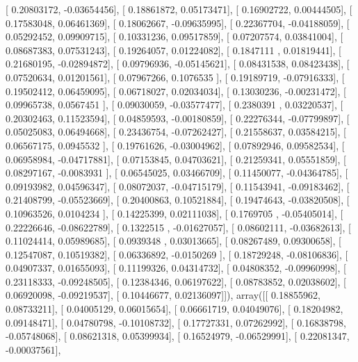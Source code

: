 \documentclass{article}
\begin{document}
       [ 0.20803172, -0.03654456],
       [ 0.18861872,  0.05173471],
       [ 0.16902722,  0.00444505],
       [ 0.17583048,  0.06461369],
       [ 0.18062667, -0.09635995],
       [ 0.22367704, -0.04188059],
       [ 0.05292452,  0.09909715],
       [ 0.10331236,  0.09517859],
       [ 0.07207574,  0.03841004],
       [ 0.08687383,  0.07531243],
       [ 0.19264057,  0.01224082],
       [ 0.1847111 ,  0.01819441],
       [ 0.21680195, -0.02894872],
       [ 0.09796936, -0.05145621],
       [ 0.08431538,  0.08423438],
       [ 0.07520634,  0.01201561],
       [ 0.07967266,  0.1076535 ],
       [ 0.19189719, -0.07916333],
       [ 0.19502412,  0.06459095],
       [ 0.06718027,  0.02034034],
       [ 0.13030236, -0.00231472],
       [ 0.09965738,  0.0567451 ],
       [ 0.09030059, -0.03577477],
       [ 0.2380391 ,  0.03220537],
       [ 0.20302463,  0.11523594],
       [ 0.04859593, -0.00180859],
       [ 0.22276344, -0.07799897],
       [ 0.05025083,  0.06494668],
       [ 0.23436754, -0.07262427],
       [ 0.21558637,  0.03584215],
       [ 0.06567175,  0.0945532 ],
       [ 0.19761626, -0.03004962],
       [ 0.07892946,  0.09582534],
       [ 0.06958984, -0.04717881],
       [ 0.07153845,  0.04703621],
       [ 0.21259341,  0.05551859],
       [ 0.08297167, -0.0083931 ],
       [ 0.06545025,  0.03466709],
       [ 0.11450077, -0.04364785],
       [ 0.09193982,  0.04596347],
       [ 0.08072037, -0.04715179],
       [ 0.11543941, -0.09183462],
       [ 0.21408799, -0.05523669],
       [ 0.20400863,  0.10521884],
       [ 0.19474643, -0.03820508],
       [ 0.10963526,  0.0104234 ],
       [ 0.14225399,  0.02111038],
       [ 0.1769705 , -0.05405014],
       [ 0.22226646, -0.08622789],
       [ 0.1322515 , -0.01627057],
       [ 0.08602111, -0.03682613],
       [ 0.11024414,  0.05989685],
       [ 0.0939348 ,  0.03013665],
       [ 0.08267489,  0.09300658],
       [ 0.12547087,  0.10519382],
       [ 0.06336892, -0.0150269 ],
       [ 0.18729248, -0.08106836],
       [ 0.04907337,  0.01655093],
       [ 0.11199326,  0.04314732],
       [ 0.04808352, -0.09960998],
       [ 0.23118333, -0.09248505],
       [ 0.12384346,  0.06197622],
       [ 0.08783852,  0.02038602],
       [ 0.06920098, -0.09219537],
       [ 0.10446677,  0.02136097]]), array([[ 0.18855962,  0.08733211],
       [ 0.04005129,  0.06015654],
       [ 0.06661719,  0.04049076],
       [ 0.18204982,  0.09148471],
       [ 0.04780798, -0.10108732],
       [ 0.17727331,  0.07262992],
       [ 0.16838798, -0.05748068],
       [ 0.08621318,  0.05399934],
       [ 0.16524979, -0.06529991],
       [ 0.22081347, -0.00037561],
\end{document}
